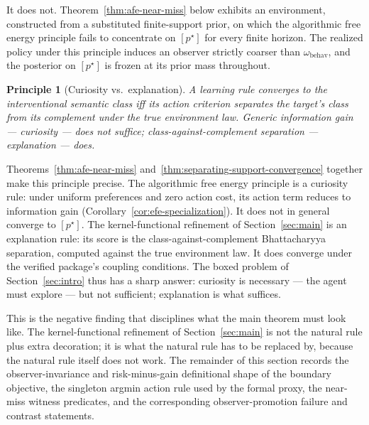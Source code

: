 \documentclass[11pt]{article}
\theoremstyle{definition}
\theoremstyle{remark}
\theoremstyle{plain}
\newtheorem*{principle}{Principle}
\theoremstyle{definition}
\begin{document}
It does not. Theorem~\ref{thm:afe-near-miss} below exhibits an environment, constructed from a substituted finite-support prior, on which the algorithmic free energy principle fails to concentrate on $[p^\star]$ for every finite horizon. The realized policy under this principle induces an observer strictly coarser than $\omega_{\mathrm{behav}}$, and the posterior on $[p^\star]$ is frozen at its prior mass throughout.

\begin{center}
\end{center}

\begin{principle}[Curiosity vs.\ explanation]
\label{prin:curiosity-vs-explanation}
A learning rule converges to the interventional semantic class iff its action criterion separates the target's class from its complement under the true environment law. Generic information gain --- \emph{curiosity} --- does not suffice; class-against-complement separation --- \emph{explanation} --- does.
\end{principle}

Theorems~\ref{thm:afe-near-miss} and~\ref{thm:separating-support-convergence} together make this principle precise. The algorithmic free energy principle is a curiosity rule: under uniform preferences and zero action cost, its action term reduces to information gain (Corollary~\ref{cor:efe-specialization}). It does not in general converge to $[p^\star]$. The kernel-functional refinement of Section~\ref{sec:main} is an explanation rule: its score is the class-against-complement Bhattacharyya separation, computed against the true environment law. It does converge under the verified package's coupling conditions. The boxed problem of Section~\ref{sec:intro} thus has a sharp answer: curiosity is necessary --- the agent must explore --- but not sufficient; explanation is what suffices.

This is the negative finding that disciplines what the main theorem must look like. The kernel-functional refinement of Section~\ref{sec:main} is not the natural rule plus extra decoration; it is what the natural rule has to be replaced by, because the natural rule itself does not work. The remainder of this section records the observer-invariance and risk-minus-gain definitional shape of the boundary objective, the singleton argmin action rule used by the formal proxy, the near-miss witness predicates, and the corresponding observer-promotion failure and contrast statements.
\end{document}
